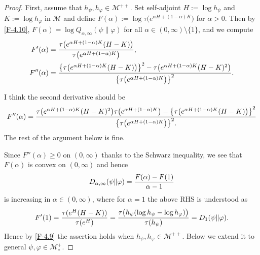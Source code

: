 \documentclass[12pt]{article}
\theoremstyle{definition}
\theoremstyle{remark}
\numberwithin{equation}{section}
\def\Me{\mathcal M}
\def\ffi{\varphi}
\begin{document}
\begin{proof}
First, assume that $h_\psi,h_\ffi\in\Me^{++}$. Set self-adjoint $H:=\log h_\psi$ and $K:=\log h_\ffi$ in $\Me$
and define $F(\alpha):=\log\tau\bigl(e^{\alpha H+(1-\alpha)K}\bigr)$ for $\alpha>0$.
Then by \eqref{F-4.10}, $F(\alpha)=\log Q_{\alpha,\infty}(\psi\|\ffi)$ for all $\alpha\in(0,\infty)\setminus\{1\}$,
and we compute
\begin{align*}
F'(\alpha)&={\tau\bigl(e^{\alpha H+(1-\alpha)K}(H-K)\bigr)\over\tau\bigl(e^{\alpha H+(1-\alpha)K}\bigr)}, \\
F''(\alpha)&={\bigl\{\tau\bigl(e^{\alpha H+(1-\alpha)K}(H-K)\bigr)\bigr\}^2
-\tau\bigl(e^{\alpha H+(1-\alpha)K}(H-K)^2\bigr)\over\bigl\{\tau\bigl(e^{\alpha H+(1-\alpha)K}\bigr)\bigr\}^2}.
\end{align*}
{\color{orange}I think the second derivative should be
\[
F''(\alpha)={\tau\bigl(e^{\alpha H+(1-\alpha)K}(H-K)^2\bigr)\tau\bigl(e^{\alpha
H+(1-\alpha)K}\bigr)-\bigl\{\tau\bigl(e^{\alpha H+(1-\alpha)K}(H-K)\bigr)\bigr\}^2
 \over\bigl\{\tau\bigl(e^{\alpha H+(1-\alpha)K}\bigr)\bigr\}^2.}
\]
The rest of the argument below is fine.

}


Since $F''(\alpha)\ge0$ on $(0,\infty)$ thanks to the Schwarz inequality, we see that $F(\alpha)$ is
convex on $(0,\infty)$ and hence
\[
D_{\alpha,\infty}(\psi\|\ffi)={F(\alpha)-F(1)\over\alpha-1}
\]
is increasing in $\alpha\in(0,\infty)$, where for $\alpha=1$ the above RHS is understood as
\[
F'(1)={\tau(e^H(H-K))\over\tau(e^H)}={\tau\bigl(h_\psi(\log h_\psi-\log h_\ffi)\bigr)\over\tau(h_\psi)}
=D_1(\psi\|\ffi).
\]
Hence by \eqref{F-4.9} the assertion holds when $h_\psi,h_\ffi\in\Me^{++}$. Below we extend it to general
$\psi,\ffi\in\Me_*^+$.


\end{proof}
\end{document}
